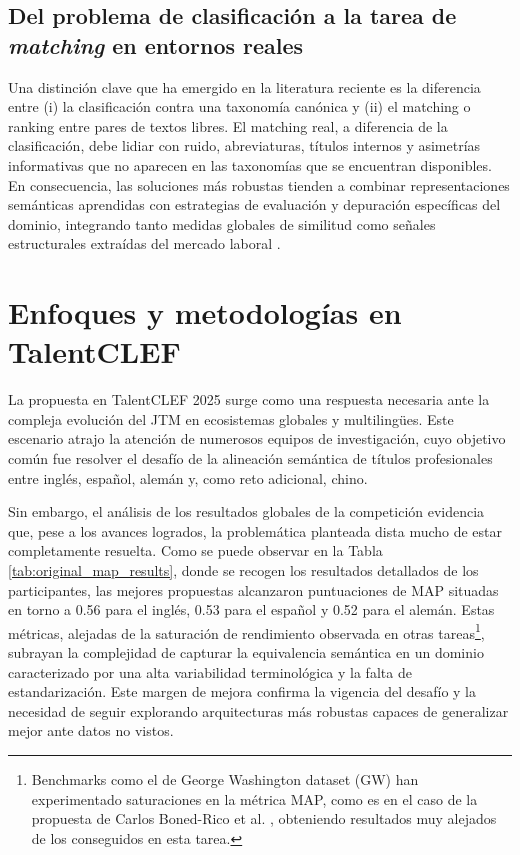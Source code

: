 \subsection{Del problema de clasificación a la tarea de \emph{matching} en entornos reales}

\noindent Una distinción clave que ha emergido en la literatura reciente es la diferencia entre (i) la clasificación contra una taxonomía canónica y (ii) el matching o ranking entre pares de textos libres. El matching real, a diferencia de la clasificación, debe lidiar con ruido, abreviaturas, títulos internos y asimetrías informativas que no aparecen en las taxonomías que se encuentran disponibles. En consecuencia, las soluciones más robustas tienden a combinar representaciones semánticas aprendidas con estrategias de evaluación y depuración específicas del dominio, integrando tanto medidas globales de similitud como señales estructurales extraídas del mercado laboral \cite{gasco2025brief}.


\section{Enfoques y metodologías en TalentCLEF}
\label{sec:TalentCLEFOverview}

\noindent La  propuesta en TalentCLEF 2025 surge como una respuesta necesaria ante la compleja evolución del \gls{JTM} en ecosistemas globales y multilingües. Este escenario atrajo la atención de numerosos equipos de investigación, cuyo objetivo común fue resolver el desafío de la alineación semántica de títulos profesionales entre inglés, español, alemán y, como reto adicional, chino.

Sin embargo, el análisis de los resultados globales de la competición evidencia que, pese a los avances logrados, la problemática planteada dista mucho de estar completamente resuelta. Como se puede observar en la Tabla \ref{tab:original_map_results}, donde se recogen los resultados detallados de los participantes, las mejores propuestas alcanzaron puntuaciones de \gls{MAP} situadas en torno a 0.56 para el inglés, 0.53 para el español y 0.52 para el alemán. Estas métricas, alejadas de la saturación de rendimiento observada en otras tareas\footnote{Benchmarks como el de George Washington dataset (GW) \cite{rath2003features} han experimentado saturaciones en la métrica \gls{MAP}, como es en el caso de la propuesta de Carlos Boned-Rico et al. \cite{papazis2025enhancing}, obteniendo resultados muy alejados de los conseguidos en esta tarea.}, subrayan la complejidad de capturar la equivalencia semántica en un dominio caracterizado por una alta variabilidad terminológica y la falta de estandarización. Este margen de mejora confirma la vigencia del desafío y la necesidad de seguir explorando arquitecturas más robustas capaces de generalizar mejor ante datos no vistos.


